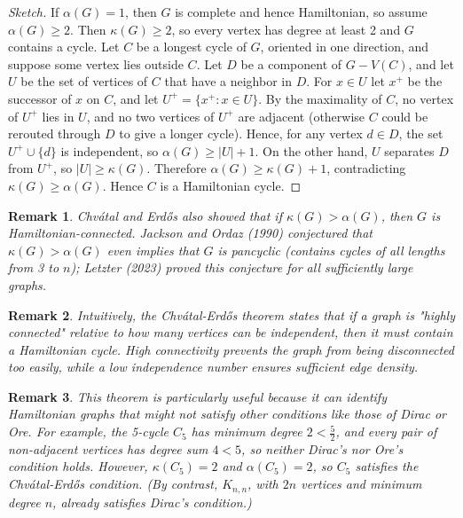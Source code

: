 \documentclass{article}
\newtheorem{remark}{Remark}
\theoremstyle{definition}
\begin{document}
\begin{proof}[Sketch]
If $\alpha(G) = 1$, then $G$ is complete and hence Hamiltonian, so assume $\alpha(G) \geq 2$. Then $\kappa(G) \geq 2$, so every vertex has degree at least 2 and $G$ contains a cycle. Let $C$ be a longest cycle of $G$, oriented in one direction, and suppose some vertex lies outside $C$. Let $D$ be a component of $G - V(C)$, and let $U$ be the set of vertices of $C$ that have a neighbor in $D$. For $x \in U$ let $x^+$ be the successor of $x$ on $C$, and let $U^+ = \{x^+ : x \in U\}$. By the maximality of $C$, no vertex of $U^+$ lies in $U$, and no two vertices of $U^+$ are adjacent (otherwise $C$ could be rerouted through $D$ to give a longer cycle). Hence, for any vertex $d \in D$, the set $U^+ \cup \{d\}$ is independent, so $\alpha(G) \geq |U| + 1$. On the other hand, $U$ separates $D$ from $U^+$, so $|U| \geq \kappa(G)$. Therefore $\alpha(G) \geq \kappa(G) + 1$, contradicting $\kappa(G) \geq \alpha(G)$. Hence $C$ is a Hamiltonian cycle.
\end{proof}

\begin{remark}
Chvátal and Erdős also showed that if $\kappa(G) > \alpha(G)$, then $G$ is Hamiltonian-connected. Jackson and Ordaz (1990) conjectured that $\kappa(G) > \alpha(G)$ even implies that $G$ is pancyclic (contains cycles of all lengths from 3 to $n$); Letzter (2023) proved this conjecture for all sufficiently large graphs.
\end{remark}

\begin{remark}
Intuitively, the Chvátal-Erdős theorem states that if a graph is "highly connected" relative to how many vertices can be independent, then it must contain a Hamiltonian cycle. High connectivity prevents the graph from being disconnected too easily, while a low independence number ensures sufficient edge density.
\end{remark}

\begin{remark}
This theorem is particularly useful because it can identify Hamiltonian graphs that might not satisfy other conditions like those of Dirac or Ore. For example, the 5-cycle $C_5$ has minimum degree $2 < \frac{5}{2}$, and every pair of non-adjacent vertices has degree sum $4 < 5$, so neither Dirac's nor Ore's condition holds. However, $\kappa(C_5) = 2$ and $\alpha(C_5) = 2$, so $C_5$ satisfies the Chvátal-Erdős condition. (By contrast, $K_{n,n}$, with $2n$ vertices and minimum degree $n$, already satisfies Dirac's condition.)
\end{remark}
\end{document}
